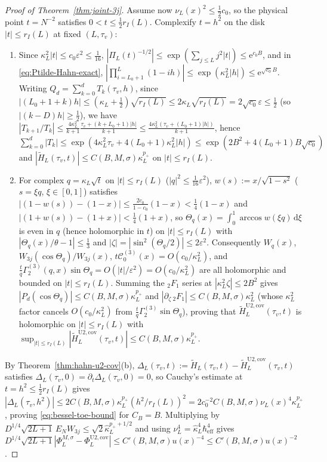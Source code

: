 \documentclass[11pt]{article}
\theoremstyle{definition}
\theoremstyle{remark}
\newcommand{\dd}{\mathrm{d}}
\newcommand{\cC}{\mathcal{C}}
\newcommand{\heff}{\hbar_{\mathrm{eff}}}
\renewcommand{\_}{\oldunderscore\penalty0\hskip0pt\relax}
\begin{document}
\begin{proof}[Proof of Theorem~\ref{thm:joint-3j}]
Assume now $\nu_L(x)^2\le\frac12 c_0$, so the physical point $t=N^{-2}$ satisfies $0<t\le\frac12 r_I(L)$. Complexify $t=h^2$ on the disk $|t|\le r_I(L)$ at fixed $(L,\tau_v)$:
\begin{enumerate}[leftmargin=2em,itemsep=2pt]
\item Since $\kappa_L^2|t|\le c_0\varepsilon^2\le\frac{1}{16}$, $|\Pi_L(t)^{-1/2}|\le\exp(\sum_{j\le L}j^2|t|)\le\mathrm{e}^{c_0
  B}$, and in \eqref{eq:Ptilde-Hahn-exact}, $|\prod_{i=L_0+1}^L(1-ih)|\le\exp(\kappa_L^2|h|)\le\mathrm{e}^{\sqrt{c_0}B}$. Writing
  $Q_d=\sum_{k=0}^d T_k(\tau_v,h)$, since $|(L_0+1+k)h|\le(\kappa_L+\tfrac12)\sqrt{r_I(L)}\le2\kappa_L\sqrt{r_I(L)}=2\sqrt{c_0}\varepsilon\le\frac12$ (so $|(k-D)h|\ge\frac12$), we have
  $|T_{k+1}/T_k|\le\frac{4\kappa_L^2}{k+1}\frac{\tau_v+(k+L_0+1)|h|}{k+1}\le\frac{4\kappa_L^2(\tau_v+(L_0+1)|h|)}{k+1}$, hence
  $\sum_{k=0}^d|T_k|\le\exp(4\kappa_L^2\tau_v+4(L_0+1)\kappa_L^2|h|)\le\exp(2B^2+4(L_0+1)B\sqrt{c_0})$ and
  $|\widetilde{H}_L(\tau_v,t)|\le C(B,M,\sigma)\kappa_L^{p_+}$ on $|t|\le r_I(L)$.
\item For complex $q=\kappa_L\sqrt{t}$ on $|t|\le r_I(L)$ ($|q|^2\le\frac{1}{16}\varepsilon^2$), $w(s):=x/\sqrt{1-s^2}$ ($s=\xi
  q$, $\xi\in[0,1]$) satisfies $|(1-w(s))-(1-x)|\le\frac{2c_0}{1-c_0}(1-x)<\frac14(1-x)$ and $|(1+w(s))-(1+x)|<\frac14(1+x)$, so
  $\Theta_q(x)=\int_0^1\arccos w(\xi q)\,\dd\xi$ is even in $q$ (hence holomorphic in $t$) on $|t|\le r_I(L)$ with
  $|\Theta_q(x)/\theta-1|\le\frac13$ and $|\zeta|=|\sin^2(\Theta_q/2)|\le 2\varepsilon^2$. Consequently $W_q(x)$,
  $W_{3j}(\cos\Theta_q)/W_{3j}(x)$, $t\cC_0^{(3)}(x)=O(c_0/\kappa_L^2)$, and
  $\frac{t}{q}\Gamma_2^{(3)}(q,x)\sin\Theta_q=O(|t|/\varepsilon^2)=O(c_0/\kappa_L^2)$ are all holomorphic and bounded on $|t|\le
  r_I(L)$. Summing the ${}_2F_1$ series at $|\kappa_L^2\zeta|\le 2B^2$ gives $|P_d(\cos\Theta_q)|\le C(B,M,\sigma)\kappa_L^{p_+}$
  and $|\partial_\zeta\,{}_2F_1|\le C(B,M,\sigma)\kappa_L^2$ (whose $\kappa_L^2$ factor cancels $O(c_0/\kappa_L^2)$ from
  $\frac{t}{q}\Gamma_2^{(3)}\sin\Theta_q$), proving that $\widetilde{H}_L^{\mathrm{U2,cov}}(\tau_v,t)$ is holomorphic on $|t|\le
  r_I(L)$ with $\sup_{|t|\le r_I(L)}|\widetilde{H}_L^{\mathrm{U2,cov}}(\tau_v,t)|\le C(B,M,\sigma)\kappa_L^{p_+}$.
\end{enumerate}
By Theorem~\ref{thm:hahn-u2-cov}(b), $\Delta_L(\tau_v,t):=\widetilde{H}_L(\tau_v,t)-\widetilde{H}_L^{\mathrm{U2,cov}}(\tau_v,t)$
  satisfies $\Delta_L(\tau_v,0)=\partial_t\Delta_L(\tau_v,0)=0$, so Cauchy's estimate at $t=h^2\le\frac12 r_I(L)$ gives
  $|\Delta_L(\tau_v,h^2)|\le 2C(B,M,\sigma)\kappa_L^{p_+}(h^2/r_I(L))^2=2c_0^{-2}C(B,M,\sigma)\nu_L(x)^4\kappa_L^{p_+}$, proving
  \eqref{eq:bessel-toe-bound} for $C_B=B$. Multiplying by $D^{1/4}\sqrt{2L+1}\,E_N W_{3j}\le\sqrt{2}\hat{\kappa}_L^{p_++1/2}$ and
  using $\nu_L^4=\hat{\kappa}_L^4\heff^4$ gives $D^{1/4}\sqrt{2L+1}|\Phi_L^{M,\sigma}-\Phi_L^{\mathrm{U2,cov}}|\le
  C'(B,M,\sigma)u(x)^{-4}\le C'(B,M,\sigma)u(x)^{-2}$.


\end{proof}
\end{document}
